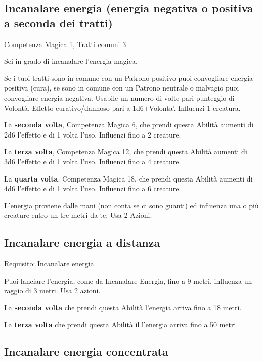 \documentclass[a4paper,11pt,twoside,openany]{book}
\begin{document}
\subsection{Incanalare energia (energia negativa o positiva a seconda dei tratti)}

Competenza Magica 1, Tratti comuni 3

Sei in grado di incanalare l'energia magica.

Se i tuoi tratti sono in comune con un Patrono positivo puoi convogliare energia positiva (cura), se sono in comune con un Patrono neutrale o malvagio puoi convogliare energia negativa. Usabile un numero di volte pari punteggio di Volontà. Effetto curativo/dannoso pari a 1d6+Volonta'. Influenzi 1 creatura.

La \textbf{seconda volta}, Competenza Magica 6, che prendi questa Abilità aumenti di 2d6 l'effetto e di 1 volta l'uso. Influenzi fino a 2 creature.

La \textbf{terza volta}, Competenza Magica 12, che prendi questa Abilità aumenti di 3d6 l'effetto e di 1 volta l'uso. Influenzi fino a 4 creature.

La \textbf{quarta volta}. Competenza Magica 18, che prendi questa Abilità aumenti di 4d6 l'effetto e di 1 volta l'uso. Influenzi fino a 6 creature.

L'energia proviene dalle mani (non conta se ci sono guanti) ed influenza una o più creature entro un tre metri da te. Usa 2 Azioni.

\subsection{Incanalare energia a distanza}

Requisito: Incanalare energia

Puoi lanciare l'energia, come da Incanalare Energia, fino a 9 metri, influenza un raggio di 3 metri. Usa 2 azioni.

La \textbf{seconda volta} che prendi questa Abilità l'energia arriva fino a 18 metri.

La \textbf{terza volta} che prendi questa Abilità il l'energia arriva fino a 50 metri.

\subsection{Incanalare energia concentrata}
\end{document}
